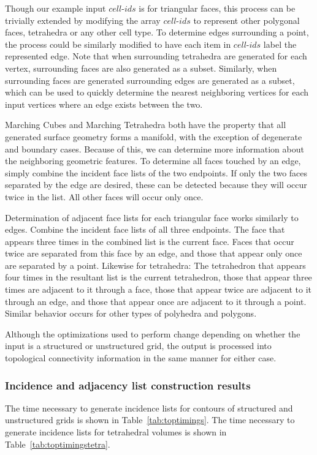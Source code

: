 \documentclass[review,journal]{vgtc}         %
\begin{document}
Though our example input $cell\mbox{-}ids$ is for triangular faces, this process can be trivially extended by modifying the array $cell\mbox{-}ids$ to represent other polygonal faces, tetrahedra or any other cell type. To determine edges surrounding a point, the process could be similarly modified to have each item in $cell\mbox{-}ids$ label the represented edge. Note that when surrounding tetrahedra are generated for each vertex, surrounding faces are also generated as a subset. Similarly, when surrounding faces are generated surrounding edges are generated as a subset, which can be used to quickly determine the nearest neighboring vertices for each input vertices where an edge exists between the two.

Marching Cubes and Marching Tetrahedra both have the property that all generated surface geometry forms a manifold, with the exception of degenerate and boundary cases. Because of this, we can determine more information about the neighboring geometric features. To determine all faces touched by an edge, simply combine the incident face lists of the two endpoints. If only the two faces separated by the edge are desired, these can be detected because they will occur twice in the list. All other faces will occur only once. 

Determination of adjacent face lists for each triangular face works similarly to edges. Combine the incident face lists of all three endpoints. The face that appears three times in the combined list is the current face. Faces that occur twice are separated from this face by an edge, and those that appear only once are separated by a point.
Likewise for tetrahedra: The tetrahedron that appears four times in the resultant list is the current tetrahedron, those that appear three times are adjacent to it through a face, those that appear twice are adjacent to it through an edge, and those that appear once are adjacent to it through a point. Similar behavior occurs for other types of polyhedra and polygons.

Although the optimizations used to perform  change depending on whether the input is a structured or unstructured grid, the output is processed into topological connectivity information in the same manner for either case.

\subsubsection{Incidence and adjacency list construction results}
The time necessary to generate incidence lists for contours of structured and unstructured grids is shown in Table~\ref{tab:toptimings}. The time necessary to generate incidence lists for tetrahedral volumes is shown in Table~\ref{tab:toptimingstetra}.
\end{document}
